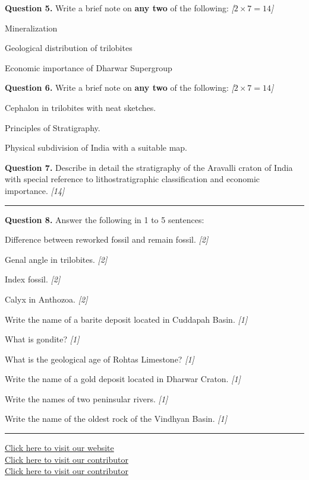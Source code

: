 \documentclass[11pt,a4paper]{article}
\newcommand{\pts}[1]{\hfill   \textit{[#1]}}
\begin{document}
\noindent   \textbf{Question 5.} Write a brief note on   \textbf{any two} of the following: \pts{$2  \times 7 = 14$}

\begin{parts}
  \item Mineralization
  \item Geological distribution of trilobites
  \item Economic importance of Dharwar Supergroup
\end{parts}

\medskip


\noindent   \textbf{Question 6.} Write a brief note on   \textbf{any two} of the following: \pts{$2  \times 7 = 14$}

\begin{parts}
  \item Cephalon in trilobites with neat sketches.
  \item Principles of Stratigraphy.
  \item Physical subdivision of India with a suitable map.
\end{parts}

\medskip


\noindent   \textbf{Question 7.} Describe in detail the stratigraphy of the Aravalli craton of India with special reference to lithostratigraphic classification and economic importance. \pts{14}

\bigskip


\rule{\linewidth}{0.4pt}\smallskip




\noindent   \textbf{Question 8.} Answer the following in 1 to 5 sentences:

\begin{parts}
  \item Difference between reworked fossil and remain fossil. \pts{2}
  \item Genal angle in trilobites. \pts{2}
  \item Index fossil. \pts{2}
  \item Calyx in Anthozoa. \pts{2}
  \item Write the name of a barite deposit located in Cuddapah Basin. \pts{1}
  \item What is gondite? \pts{1}
  \item What is the geological age of Rohtas Limestone? \pts{1}
  \item Write the name of a gold deposit located in Dharwar Craton. \pts{1}
  \item Write the names of two peninsular rivers. \pts{1}
  \item Write the name of the oldest rock of the Vindhyan Basin. \pts{1}
\end{parts}

\vfill\rule{\linewidth}{0.4pt}

\begin{center}\small
\href{https://bhu-exam.vercel.app/}{Click here to visit our website}\\[4pt]
\href{https://me-aryan.vercel.app/}{Click here to visit our contributor}\\[4pt]
\href{https://quashan-me.vercel.app/}{Click here to visit our contributor}
\end{center}
\end{document}
